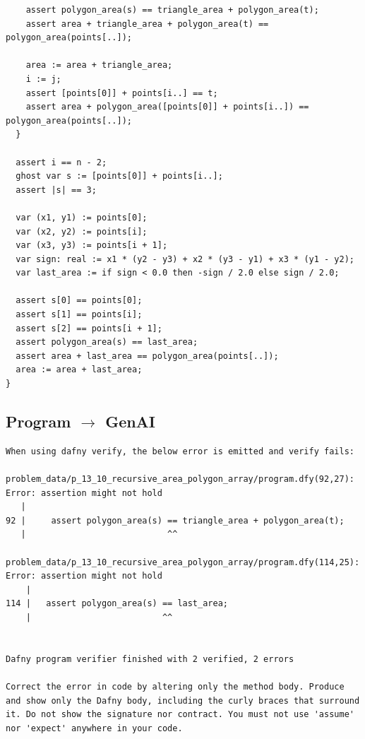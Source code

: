 \documentclass{article}
\begin{document}
\begin{lstlisting}
    assert polygon_area(s) == triangle_area + polygon_area(t);
    assert area + triangle_area + polygon_area(t) == polygon_area(points[..]);

    area := area + triangle_area;
    i := j;
    assert [points[0]] + points[i..] == t;
    assert area + polygon_area([points[0]] + points[i..]) == polygon_area(points[..]);
  }

  assert i == n - 2;
  ghost var s := [points[0]] + points[i..];
  assert |s| == 3;

  var (x1, y1) := points[0];
  var (x2, y2) := points[i];
  var (x3, y3) := points[i + 1];
  var sign: real := x1 * (y2 - y3) + x2 * (y3 - y1) + x3 * (y1 - y2);
  var last_area := if sign < 0.0 then -sign / 2.0 else sign / 2.0;

  assert s[0] == points[0];
  assert s[1] == points[i];
  assert s[2] == points[i + 1];
  assert polygon_area(s) == last_area;
  assert area + last_area == polygon_area(points[..]);
  area := area + last_area;
}
\end{lstlisting}
\subsection*{Program $\rightarrow$ GenAI}
\begin{lstlisting}
When using dafny verify, the below error is emitted and verify fails:

problem_data/p_13_10_recursive_area_polygon_array/program.dfy(92,27): Error: assertion might not hold
   |
92 |     assert polygon_area(s) == triangle_area + polygon_area(t);
   |                            ^^

problem_data/p_13_10_recursive_area_polygon_array/program.dfy(114,25): Error: assertion might not hold
    |
114 |   assert polygon_area(s) == last_area;
    |                          ^^


Dafny program verifier finished with 2 verified, 2 errors

Correct the error in code by altering only the method body. Produce and show only the Dafny body, including the curly braces that surround it. Do not show the signature nor contract. You must not use 'assume' nor 'expect' anywhere in your code.
\end{lstlisting}
\end{document}
